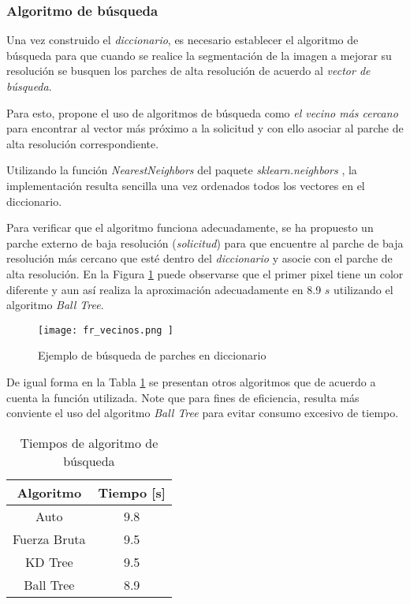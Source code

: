 \subsubsection{Algoritmo de búsqueda}
\noindent
Una vez construido el \emph{diccionario}, es necesario establecer el algoritmo de 
búsqueda para que cuando se realice la segmentación de la imagen a mejorar 
su resolución se busquen los parches de alta resolución de acuerdo al 
\emph{vector de búsqueda}.

Para esto, \cite{freeman} propone el uso de algoritmos de búsqueda como 
\emph{el vecino más cercano} para encontrar al vector más próximo a la solicitud
y con ello asociar al parche de alta resolución correspondiente. 

Utilizando la función \emph{NearestNeighbors} del paquete \emph{sklearn.neighbors} \cite{scikit-learn},
la implementación resulta sencilla una vez ordenados todos los vectores en el 
diccionario. 

Para verificar que el algoritmo funciona adecuadamente, se ha propuesto un 
parche externo de baja resolución (\emph{solicitud}) para 
que encuentre al parche de baja resolución más cercano que esté dentro del
\emph{diccionario} y asocie con el parche de alta resolución. En la Figura
\ref{fig:fr_vecinos} puede observarse que el primer pixel tiene un color 
diferente y aun así realiza la aproximación adecuadamente en 8.9 $s$
utilizando el algoritmo \emph{Ball Tree}.  

\begin{figure}[H]
    \texttt{[image:  fr\_vecinos.png ]}
    \centering
    \caption{ Ejemplo de búsqueda de parches en diccionario}
    \label{fig:fr_vecinos}
\end{figure}

De igual forma en la Tabla \ref{fig:fr_vecinos} se presentan otros algoritmos 
que de acuerdo a \cite{NN_search} cuenta la función utilizada. Note que 
para fines de eficiencia, resulta más conviente el uso del algoritmo
\emph{Ball Tree} para evitar consumo excesivo de tiempo. 

\begin{table}[H]
    \caption{Tiempos de algoritmo de búsqueda}
    \label{tb:tiempos_snn}
    \centering
    \begin{tabular}{|c|c|}
    \hline
    Algoritmo    & Tiempo {[}s{]} \\ \hline
    Auto         & 9.8            \\ \hline
    Fuerza Bruta & 9.5            \\ \hline
    KD Tree      & 9.5            \\ \hline
    Ball Tree    & 8.9            \\ \hline
    \end{tabular}
\end{table}


